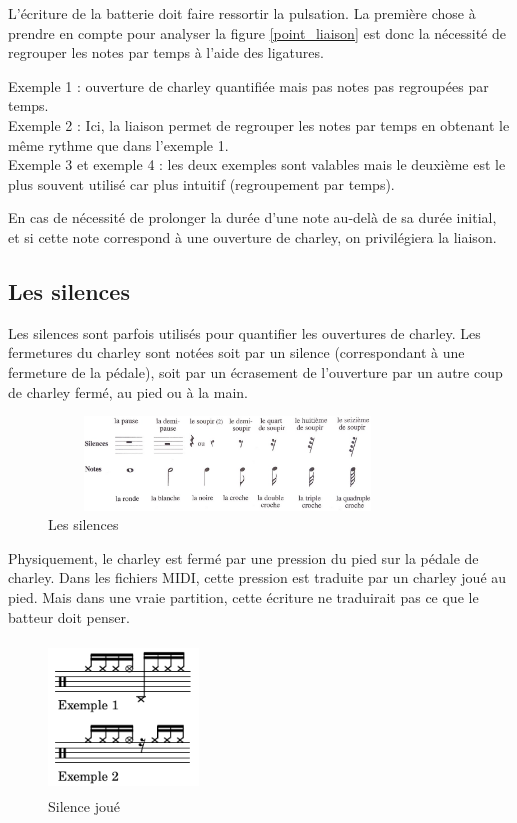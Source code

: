 L’écriture de la batterie doit faire ressortir la pulsation. 
La première chose à prendre en compte pour analyser la figure \ref{point_liaison} est donc la nécessité de regrouper les notes par temps à l’aide des ligatures.

Exemple 1 : ouverture de charley quantifiée mais pas notes pas regroupées par temps.\\
Exemple 2 : Ici, la liaison permet de regrouper les notes par temps en obtenant le même rythme que dans l’exemple 1.\\
Exemple 3 et exemple 4 : les deux exemples sont valables mais le deuxième est le plus souvent utilisé car plus intuitif (regroupement par temps).

En cas de nécessité de prolonger la durée d’une note au-delà 
de sa durée initial, et si cette note correspond à une ouverture de charley, on privilégiera la liaison.


\subsection*{Les silences}
Les silences sont parfois utilisés pour quantifier 
les ouvertures de charley. 
Les fermetures du charley sont notées soit par un silence (correspondant à une fermeture de la pédale), 
soit par un écrasement de l’ouverture par un autre coup de charley fermé, au pied ou à la main.

\begin{figure}[h]
	\centering
	\includegraphics[height=25mm, width=95mm]{z_images/3_methodes/0_notation_de_la_batterie/4_silences.png}
	\caption{Les silences}
	\label{silences}
\end{figure}\newpage

Physiquement, le charley est fermé par une pression du pied sur la pédale de charley. Dans les fichiers MIDI, cette pression est traduite par un charley joué au pied. Mais dans une vraie partition, 
cette écriture ne traduirait pas ce que le batteur doit penser.

\begin{figure}[h]
	\centering
	\includegraphics[height=40mm, width=40mm]{z_images/3_methodes/0_notation_de_la_batterie/5_silence_joue.png}
	\caption{Silence joué}
	\label{silence joue}
\end{figure}

